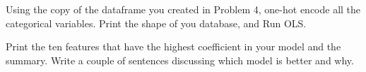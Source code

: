 \begin{problem}

Using the copy of the dataframe you created in Problem 4, one-hot encode all the categorical variables.
Print the shape of you database, and Run OLS.

Print the ten features that have the highest coefficient in your model and the summary.
Write a couple of sentences discussing which model is better and why.

\end{problem}

\begin{comment}
\url{https://docs.google.com/spreadsheets/d/1oJBaH2x369leRtL19HD8n1oZlGqwK9Yz9b14ppUEhXg/edit#gid=439114268} birth quarter affects percentiles
\end{comment}